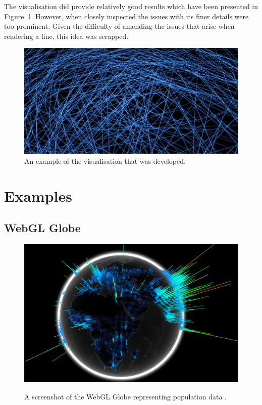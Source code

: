 \documentclass[
	fontsize=11pt
	headlines=2,
	footlines=2,
	parskip=half
]{scrartcl}
\begin{document}
\begin{appendices}
{			The visualisation did provide relatively good results which have been presented in Figure~\ref{fig:proof_of_concept}. However, when closely inspected the issues with its finer details were too prominent. Given the difficulty of amending the issues that arise when rendering a line, this idea was scrapped.
			
			\begin{figure}[H]
        		\includegraphics[width=\textwidth]{images/proof-of-concept}
				\caption{An example of the visualisation that was developed.}
				\label{fig:proof_of_concept}
			\end{figure}
		
		}
		
		\newpage
	
		\section{Examples} {
		\label{app:examples}
		
			\subsection{WebGL Globe} {
			\label{app:globe}
		
				\begin{figure}[H]
        			\href{https://www.chromeexperiments.com/globe}{\includegraphics[width=\textwidth]{images/globe}}
					\caption{A screenshot of the WebGL Globe representing population data \citep{google2011globe}.}
					\label{fig:webgl_globe}
				\end{figure}
		
}}
\end{appendices}
\end{document}

